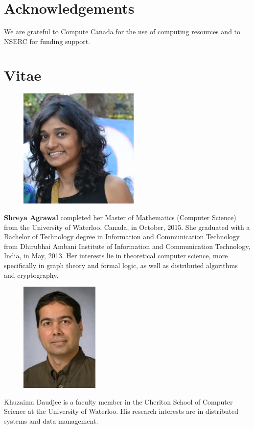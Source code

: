 \section{Acknowledgements}
We are grateful to Compute Canada for the use of computing resources and to NSERC for funding support.

\section{Vitae}

\begin{figure}
    \includegraphics[scale=0.4]{shreya.jpg}
\end{figure}

\textbf{Shreya Agrawal} completed her Master of Mathematics (Computer Science) from the University of Waterloo, Canada, in October, 2015. She graduated with a Bachelor of Technology degree in Information and Communication Technology from Dhirubhai Ambani Institute of Information and Communication Technology, India, in May, 2013. Her interests lie in theoretical computer science, more specifically in graph theory and formal logic, as well as distributed algorithms and cryptography. \\


\begin{figure}
    \vspace{-10pt}
    \includegraphics[scale=0.5]{kdaudjee.jpg}
\end{figure}

Khuzaima Daudjee is a faculty member in the Cheriton School of Computer
Science at the University of Waterloo. His research interests are in
distributed systems and data management.

